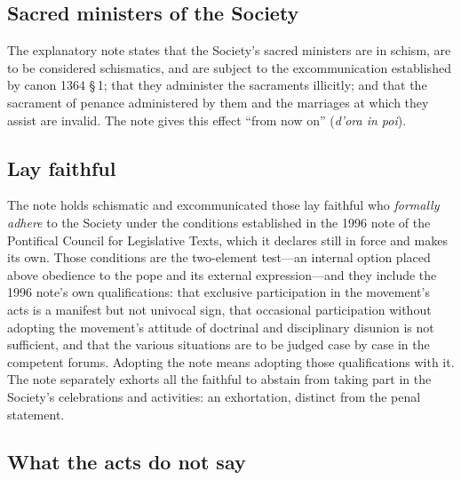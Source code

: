\subsection{Sacred ministers of the Society}

The explanatory note states that the Society's sacred ministers are in
schism, are to be considered schismatics, and are subject to the
excommunication established by canon 1364 \S\,1; that they administer the
sacraments illicitly; and that the sacrament of penance administered by
them and the marriages at which they assist are invalid. The note gives
this effect ``from now on'' (\textit{d'ora in poi}).

\subsection{Lay faithful}

The note holds schismatic and excommunicated those lay faithful who
\emph{formally adhere} to the Society under the conditions established in
the 1996 note of the Pontifical Council for Legislative Texts, which it
declares still in force and makes its own. Those conditions are the
two-element test---an internal option placed above obedience to the pope
and its external expression---and they include the 1996 note's own
qualifications: that exclusive participation in the movement's acts is a
manifest but not univocal sign, that occasional participation without
adopting the movement's attitude of doctrinal and disciplinary disunion
is not sufficient, and that the various situations are to be judged case
by case in the competent forums. Adopting the note means adopting those
qualifications with it. The note separately exhorts all the faithful to
abstain from taking part in the Society's celebrations and activities:
an exhortation, distinct from the penal statement.

\subsection{What the acts do not say}

